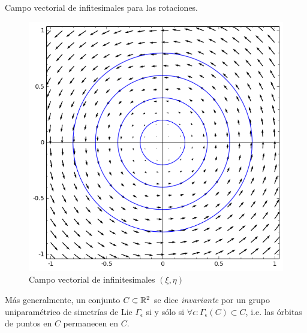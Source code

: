 \begin{ejemplo}{}
Campo vectorial de infitesimales para las rotaciones. 
\end{ejemplo}
\begin{figure}[h]
 \begin{center}
  \includegraphics[scale=.3]{imagenes/CampoVectorial.png}
 \end{center}
\caption{Campo vectorial de infinitesimales $(\xi,\eta)$ }
\end{figure}

\begin{definicion}
 Más generalmente, un conjunto $C\subset\mathbb{R}^2$ se dice \emph{invariante} por un grupo uniparamétrico de 
simetrías de Lie $\Gamma_{\epsilon}$ si y sólo si $\forall \epsilon: \Gamma_{\epsilon}(C)\subset C$, i.e. las órbitas de puntos en $C$ permanecen en $C$.
\end{definicion}

